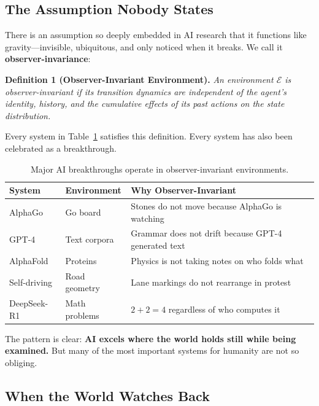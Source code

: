 \documentclass[11pt,a4paper]{article}
\begin{document}
\subsection{The Assumption Nobody States}

There is an assumption so deeply embedded in AI research that it functions like gravity---invisible, ubiquitous, and only noticed when it breaks. We call it \textbf{observer-invariance}:

\vspace{0.5em}
\noindent\textbf{Definition 1 (Observer-Invariant Environment).} \textit{An environment $\mathcal{E}$ is observer-invariant if its transition dynamics are independent of the agent's identity, history, and the cumulative effects of its past actions on the state distribution.}
\vspace{0.5em}

Every system in Table~\ref{tab:observer-invariant} satisfies this definition. Every system has also been celebrated as a breakthrough.

\begin{table}[h]
\centering
\caption{Major AI breakthroughs operate in observer-invariant environments.}
\label{tab:observer-invariant}
\begin{tabular}{@{}lll@{}}
\toprule
\textbf{System} & \textbf{Environment} & \textbf{Why Observer-Invariant} \\
\midrule
AlphaGo & Go board & Stones do not move because AlphaGo is watching \\
GPT-4 & Text corpora & Grammar does not drift because GPT-4 generated text \\
AlphaFold & Proteins & Physics is not taking notes on who folds what \\
Self-driving & Road geometry & Lane markings do not rearrange in protest \\
DeepSeek-R1 & Math problems & $2+2=4$ regardless of who computes it \\
\bottomrule
\end{tabular}
\end{table}

The pattern is clear: \textbf{AI excels where the world holds still while being examined.} But many of the most important systems for humanity are not so obliging.

\subsection{When the World Watches Back}
\end{document}
